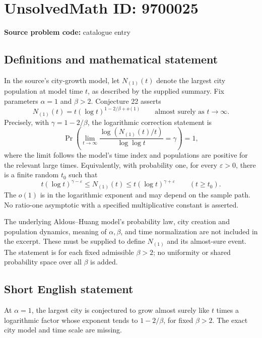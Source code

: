 \documentclass[11pt]{article}
\begin{document}
\section*{UnsolvedMath ID: 9700025}
\textbf{Source problem code:} catalogue entry
\subsection{Definitions and mathematical statement}
In the source's city-growth model, let \(N_{(1)}(t)\) denote the largest city population at model time \(t\), as described by the supplied summary. Fix parameters \(\alpha=1\) and \(\beta>2\). Conjecture 22 asserts
\[
 N_{(1)}(t)=t(\log t)^{1-2/\beta+o(1)}\qquad\text{almost surely as }t\to\infty.
\]
Precisely, with \(\gamma=1-2/\beta\), the logarithmic correction statement is
\[
 \Pr\left(\lim_{t\to\infty}
 \frac{\log(N_{(1)}(t)/t)}{\log\log t}=\gamma\right)=1,
\]
where the limit follows the model's time index and populations are positive for the relevant large times. Equivalently, with probability one, for every \(\varepsilon>0\), there is a finite random \(t_0\) such that
\[
 t(\log t)^{\gamma-\varepsilon}\leq N_{(1)}(t)
 \leq t(\log t)^{\gamma+\varepsilon}\qquad(t\geq t_0).
\]
The \(o(1)\) is in the logarithmic exponent and may depend on the sample path. No ratio-one asymptotic with a specified multiplicative constant is asserted.

The underlying Aldous--Huang model's probability law, city creation and population dynamics, meaning of \(\alpha,\beta\), and time normalization are not included in the excerpt. These must be supplied to define \(N_{(1)}\) and its almost-sure event. The statement is for each fixed admissible \(\beta>2\); no uniformity or shared probability space over all \(\beta\) is added.
\subsection{Short English statement}
At \(\alpha=1\), the largest city is conjectured to grow almost surely like \(t\) times a logarithmic factor whose exponent tends to \(1-2/\beta\), for fixed \(\beta>2\). The exact city model and time scale are missing.
\end{document}
